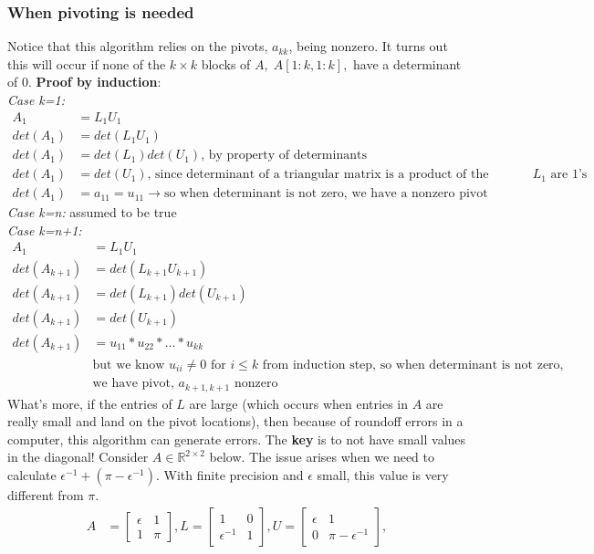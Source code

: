 \documentclass{article}
\begin{document}
\subsubsection{When pivoting is needed}
Notice that this algorithm relies on the pivots, $a_{kk}$, being nonzero. It turns out this will occur if none of the $k \times k$ blocks of $A, \; A[1:k, 1:k],$ have a determinant of 0. \textbf{Proof by induction}:\\
\textit{Case k=1:} 
\begin{align*}
    A_1 &= L_1U_1\\
    det(A_1) &= det(L_1U_1)\\
    det(A_1) &= det(L_1)det(U_1) \textrm{, by property of determinants}\\
    det(A_1) &= det(U_1) \textrm{, since determinant of a triangular matrix is a product of the diagonals and the diagonal of $L_1$ are 1's}\\
    det(A_1) &= a_{11} = u_{11} \rightarrow \textrm{so when determinant is not zero, we have a nonzero pivot}
\end{align*}
\textit{Case k=n:} assumed to be true\\
\textit{Case k=n+1:}
\begin{align*}
    A_1 &= L_1U_1\\
    det(A_{k+1}) &= det(L_{k+1}U_{k+1})\\
    det(A_{k+1}) &= det(L_{k+1})det(U_{k+1})\\
    det(A_{k+1}) &= det(U_{k+1}) \\
    det(A_{k+1}) &= u_{11}*u_{22}*\dots*u_{kk}\\
    & \textrm{but we know $u_{ii} \neq 0$ for $i \leq k$ from induction step, so when determinant is not zero,} \\ 
    & \textrm{we have pivot, $a_{k+1, k+1}$ nonzero}
\end{align*}
What's more, if the entries of $L$ are large (which occurs when entries in $A$ are really small and land on the pivot locations), then because of roundoff errors in a computer, this algorithm can generate errors. The \textbf{key} is to not have small values in the diagonal! Consider $A \in \mathbb{R}^{2\times 2}$ below. The issue arises when we need to calculate $\epsilon^{-1} + (\pi - \epsilon^{-1})$. With finite precision and $\epsilon$ small, this value is very different from $\pi$.
\begin{align*}
    A &= \begin{bmatrix} \epsilon & 1\\ 1 &  \pi \end{bmatrix},
    L = \begin{bmatrix} 1 & 0\\ \epsilon^{-1}& 1 \end{bmatrix},
    U = \begin{bmatrix} \epsilon & 1\\ 0 &  \pi - \epsilon^{-1} \end{bmatrix},
\end{align*}
\end{document}
